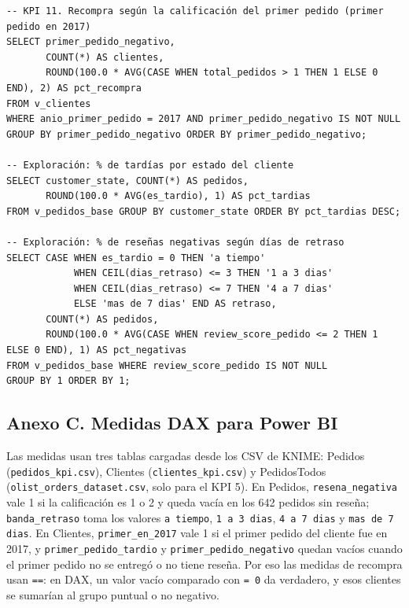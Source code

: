 \documentclass[a4paper,stu,12pt,donotrepeattitle,floatsintext]{apa7}
\begin{document}
\begin{lstlisting}
-- KPI 11. Recompra según la calificación del primer pedido (primer pedido en 2017)
SELECT primer_pedido_negativo,
       COUNT(*) AS clientes,
       ROUND(100.0 * AVG(CASE WHEN total_pedidos > 1 THEN 1 ELSE 0 END), 2) AS pct_recompra
FROM v_clientes
WHERE anio_primer_pedido = 2017 AND primer_pedido_negativo IS NOT NULL
GROUP BY primer_pedido_negativo ORDER BY primer_pedido_negativo;

-- Exploración: % de tardías por estado del cliente
SELECT customer_state, COUNT(*) AS pedidos,
       ROUND(100.0 * AVG(es_tardio), 1) AS pct_tardias
FROM v_pedidos_base GROUP BY customer_state ORDER BY pct_tardias DESC;

-- Exploración: % de reseñas negativas según días de retraso
SELECT CASE WHEN es_tardio = 0 THEN 'a tiempo'
            WHEN CEIL(dias_retraso) <= 3 THEN '1 a 3 dias'
            WHEN CEIL(dias_retraso) <= 7 THEN '4 a 7 dias'
            ELSE 'mas de 7 dias' END AS retraso,
       COUNT(*) AS pedidos,
       ROUND(100.0 * AVG(CASE WHEN review_score_pedido <= 2 THEN 1 ELSE 0 END), 1) AS pct_negativas
FROM v_pedidos_base WHERE review_score_pedido IS NOT NULL
GROUP BY 1 ORDER BY 1;
\end{lstlisting}
\subsection{Anexo C. Medidas DAX para Power BI}
Las medidas usan tres tablas cargadas desde los CSV de KNIME: Pedidos (\texttt{pedidos\_\allowbreak{}kpi.csv}), Clientes (\texttt{clientes\_\allowbreak{}kpi.csv}) y PedidosTodos (\texttt{olist\_\allowbreak{}orders\_\allowbreak{}dataset.csv}, solo para el KPI 5). En Pedidos, \texttt{resena\_\allowbreak{}negativa} vale 1 si la calificación es 1 o 2 y queda vacía en los 642 pedidos sin reseña; \texttt{banda\_\allowbreak{}retraso} toma los valores \texttt{a tiempo}, \texttt{1 a 3 dias}, \texttt{4 a 7 dias} y \texttt{mas de 7 dias}. En Clientes, \texttt{primer\_\allowbreak{}en\_\allowbreak{}2017} vale 1 si el primer pedido del cliente fue en 2017, y \texttt{primer\_\allowbreak{}pedido\_\allowbreak{}tardio} y \texttt{primer\_\allowbreak{}pedido\_\allowbreak{}negativo} quedan vacíos cuando el primer pedido no se entregó o no tiene reseña. Por eso las medidas de recompra usan \texttt{==}: en DAX, un valor vacío comparado con \texttt{= 0} da verdadero, y esos clientes se sumarían al grupo puntual o no negativo.
\end{document}
